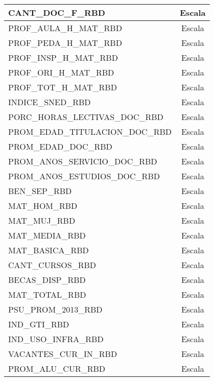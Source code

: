 \begin{longtable}{|l|c|}
CANT\_DOC\_F\_RBD                     & Escala            \\ \hline
PROF\_AULA\_H\_MAT\_RBD               & Escala            \\ \hline
PROF\_PEDA\_H\_MAT\_RBD               & Escala            \\ \hline
PROF\_INSP\_H\_MAT\_RBD               & Escala            \\ \hline
PROF\_ORI\_H\_MAT\_RBD                & Escala            \\ \hline
PROF\_TOT\_H\_MAT\_RBD                & Escala            \\ \hline
INDICE\_SNED\_RBD                     & Escala            \\ \hline
PORC\_HORAS\_LECTIVAS\_DOC\_RBD       & Escala            \\ \hline
PROM\_EDAD\_TITULACION\_DOC\_RBD      & Escala            \\ \hline
PROM\_EDAD\_DOC\_RBD                  & Escala            \\ \hline
PROM\_ANOS\_SERVICIO\_DOC\_RBD        & Escala            \\ \hline
PROM\_ANOS\_ESTUDIOS\_DOC\_RBD        & Escala            \\ \hline
BEN\_SEP\_RBD                         & Escala            \\ \hline
MAT\_HOM\_RBD                         & Escala            \\ \hline
MAT\_MUJ\_RBD                         & Escala            \\ \hline
MAT\_MEDIA\_RBD                       & Escala            \\ \hline
MAT\_BASICA\_RBD                      & Escala            \\ \hline
CANT\_CURSOS\_RBD                     & Escala            \\ \hline
BECAS\_DISP\_RBD                      & Escala            \\ \hline
MAT\_TOTAL\_RBD                       & Escala            \\ \hline
PSU\_PROM\_2013\_RBD                  & Escala            \\ \hline
IND\_GTI\_RBD                         & Escala            \\ \hline
IND\_USO\_INFRA\_RBD                  & Escala            \\ \hline
VACANTES\_CUR\_IN\_RBD                & Escala            \\ \hline
PROM\_ALU\_CUR\_RBD                   & Escala            \\ \hline

\end{longtable}
